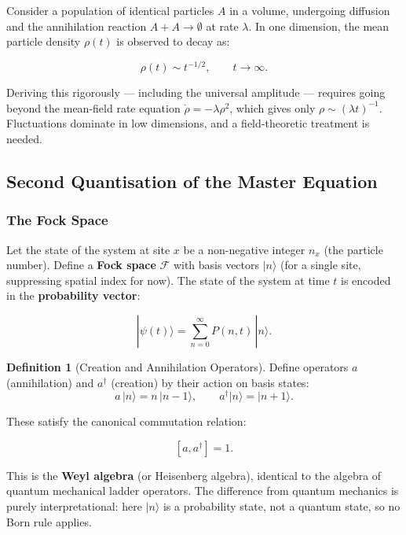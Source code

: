 \documentclass[11pt,a4paper]{article}
\theoremstyle{definition}
\newtheorem{definition}[theorem]{Definition}
\newcommand{\ad}{a^\dagger}
\begin{document}
Consider a population of identical particles $A$ in a volume, undergoing
diffusion and the annihilation reaction $A + A \to \emptyset$ at rate $\lambda$.
In one dimension, the mean particle density $\rho(t)$ is observed to decay as:

\[
  \rho(t) \sim t^{-1/2}, \qquad t\to\infty.
\]

Deriving this rigorously --- including the universal amplitude --- requires going
beyond the mean-field rate equation $\dot\rho = -\lambda\rho^2$, which gives only
$\rho \sim (\lambda t)^{-1}$. Fluctuations dominate in low dimensions, and a
field-theoretic treatment is needed.

\subsection{Second Quantisation of the Master Equation}

\subsubsection{The Fock Space}

Let the state of the system at site $x$ be a non-negative integer $n_x$ (the
particle number). Define a \textbf{Fock space} $\mathcal{F}$ with basis vectors
$|n\rangle$ (for a single site, suppressing spatial index for now). The state of
the system at time $t$ is encoded in the \textbf{probability vector}:

\begin{equation}
  |\psi(t)\rangle = \sum_{n=0}^\infty P(n,t)\,|n\rangle.
  \label{eq:fock_state}
\end{equation}

\begin{definition}[Creation and Annihilation Operators]
Define operators $a$ (annihilation) and $\ad$ (creation) by their action on
basis states:
\begin{equation}
  a\,|n\rangle = n\,|n-1\rangle, \qquad
  \ad|n\rangle = |n+1\rangle.
  \label{eq:ladder}
\end{equation}
\end{definition}

These satisfy the canonical commutation relation:

\begin{equation}
  \boxed{[a, \ad] = 1.}
  \label{eq:ccr}
\end{equation}

This is the \textbf{Weyl algebra} (or Heisenberg algebra), identical to the
algebra of quantum mechanical ladder operators. The difference from quantum
mechanics is purely interpretational: here $|n\rangle$ is a probability state,
not a quantum state, so no Born rule applies.
\end{document}
